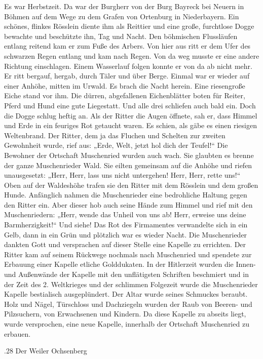 \documentclass{book}
\begin{document}
Es war Herbstzeit. Da war der Burgherr von der Burg Bayreck bei Neuern in Böhmen
auf dem Wege zu dem Grafen von Ortenburg in Niederbayern. Ein schönes, flinkes
Rösslein diente ihm als Reittier und eine große, furchtlose Dogge bewachte und
beschützte ihn, Tag und Nacht. Den böhmischen Flussläufen entlang reitend kam er
zum Fuße des Arbers. Von hier aus ritt er dem Ufer des schwarzen Regen entlang
und kam nach Regen. Von da weg musste er eine andere Richtung einschlagen. Einem
Wasserlauf folgen konnte er von da ab nicht mehr. Er ritt bergauf, hergab, durch
Täler und über Berge. Einmal war er wieder auf einer Anhöhe, mitten im Urwald.
Es brach die Nacht herein. Eine riesengroße Eiche stand vor ihm. Die dürren,
abgefallenen Eichenblätter boten für Reiter, Pferd und Hund eine gute
Liegestatt. Und alle drei schliefen auch bald ein. Doch die Dogge schlug heftig
an. Als der Ritter die Augen öffnete, sah er, dass Himmel und Erde in ein
feuriges Rot getaucht waren. Es schien, als gäbe es einen riesigen Weltenbrand.
Der Ritter, dem ja das Fluchen und Schelten zur zweiten Gewohnheit wurde, rief
aus: „Erde, Welt, jetzt hol dich der Teufel!“ Die Bewohner der Ortschaft
Muschenried wurden auch wach. Sie glaubten es brenne der ganze Muschenrieder
Wald. Sie eilten gemeinsam auf die Anhöhe und riefen unausgesetzt: „Herr, Herr,
lass uns nicht untergehen! Herr, Herr, rette uns!“ Oben auf der Waldeshöhe
trafen sie den Ritter mit dem Rösslein und dem großen Hunde. Anfänglich nahmen
die Muschenrieder eine bedrohliche Haltung gegen den Ritter ein. Aber dieser hob
auch seine Hände zum Himmel und rief mit den Muschenriedern: „Herr, wende das
Unheil von uns ab! Herr, erweise uns deine Barmherzigkeit!“ Und siehe! Das Rot
des Firmamentes verwandelte sich in ein Gelb, dann in ein Grün und plötzlich war
es wieder Nacht. Die Muschenrieder dankten Gott und versprachen auf dieser
Stelle eine Kapelle zu errichten. Der Ritter kam auf seinem Rückwege nochmals
nach Muschenried und spendete zur Erbauung einer Kapelle etliche Golddukaten. In
der Hitlerzeit wurden die Innen- und Außenwände der Kapelle mit den unflätigsten
Schriften beschmiert und in der Zeit des 2. Weltkrieges und der schlimmen
Folgezeit wurde die Muschenrieder Kapelle bestialisch ausgeplündert. Der Altar
wurde seines Schmuckes beraubt. Holz und Nägel, Türschloss und Dachziegeln
wurden der Raub von Beeren- und Pilzsuchern, von Erwachsenen und Kindern. Da
diese Kapelle zu abseits liegt, wurde versprochen, eine neue Kapelle, innerhalb
der Ortschaft Muschenried zu erbauen.

.28 Der Weiler Ochsenberg
\end{document}
